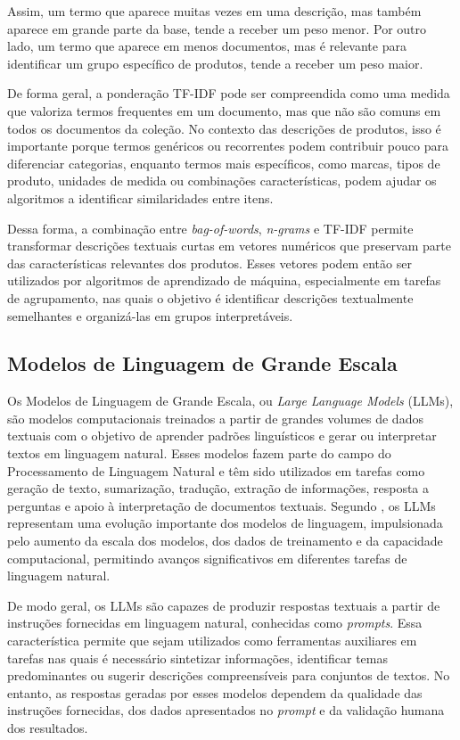\documentclass[english,brazilian]{UNISINOSmonografia}
\begin{document}
Assim, um termo que aparece muitas vezes em uma descrição, mas também aparece em grande parte da base, tende a receber um peso menor. Por outro lado, um termo que aparece em menos documentos, mas é relevante para identificar um grupo específico de produtos, tende a receber um peso maior.

De forma geral, a ponderação TF-IDF pode ser compreendida como uma medida que valoriza termos frequentes em um documento, mas que não são comuns em todos os documentos da coleção. No contexto das descrições de produtos, isso é importante porque termos genéricos ou recorrentes podem contribuir pouco para diferenciar categorias, enquanto termos mais específicos, como marcas, tipos de produto, unidades de medida ou combinações características, podem ajudar os algoritmos a identificar similaridades entre itens.

Dessa forma, a combinação entre \textit{bag-of-words}, \textit{n-grams} e TF-IDF permite transformar descrições textuais curtas em vetores numéricos que preservam parte das características relevantes dos produtos. Esses vetores podem então ser utilizados por algoritmos de aprendizado de máquina, especialmente em tarefas de agrupamento, nas quais o objetivo é identificar descrições textualmente semelhantes e organizá-las em grupos interpretáveis.

\subsection{Modelos de Linguagem de Grande Escala}

Os Modelos de Linguagem de Grande Escala, ou \textit{Large Language Models} (LLMs), são modelos computacionais treinados a partir de grandes volumes de dados textuais com o objetivo de aprender padrões linguísticos e gerar ou interpretar textos em linguagem natural. Esses modelos fazem parte do campo do Processamento de Linguagem Natural e têm sido utilizados em tarefas como geração de texto, sumarização, tradução, extração de informações, resposta a perguntas e apoio à interpretação de documentos textuais. Segundo \cite{zhao2023survey}, os LLMs representam uma evolução importante dos modelos de linguagem, impulsionada pelo aumento da escala dos modelos, dos dados de treinamento e da capacidade computacional, permitindo avanços significativos em diferentes tarefas de linguagem natural.

De modo geral, os LLMs são capazes de produzir respostas textuais a partir de instruções fornecidas em linguagem natural, conhecidas como \textit{prompts}. Essa característica permite que sejam utilizados como ferramentas auxiliares em tarefas nas quais é necessário sintetizar informações, identificar temas predominantes ou sugerir descrições compreensíveis para conjuntos de textos. No entanto, as respostas geradas por esses modelos dependem da qualidade das instruções fornecidas, dos dados apresentados no \textit{prompt} e da validação humana dos resultados.
\end{document}
